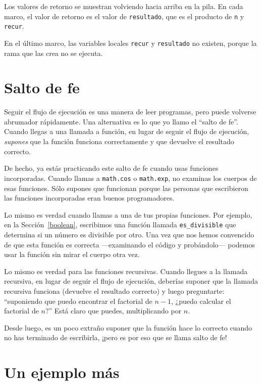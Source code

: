 \documentclass[10pt]{book}
\begin{document}
Los valores de retorno se muestran volviendo hacia arriba en la pila.  En cada
marco, el valor de retorno es el valor de {\tt resultado}, que es el
producto de {\tt n} y {\tt recur}.

En el último marco, las variables
locales {\tt recur} y {\tt resultado} no existen, porque
la rama que las crea no se ejecuta.


\section{Salto de fe}

Seguir el flujo de ejecución es una manera de leer programas, pero
puede volverse abrumador rápidamente.  Una
alternativa es lo que yo llamo el ``salto de fe''.  Cuando llegas a una
llamada a función, en lugar de seguir el flujo de ejecución, {\em
supones} que la función funciona correctamente y que devuelve el resultado
correcto.

De hecho, ya estás practicando este salto de fe cuando usas
funciones incorporadas.  Cuando llamas a {\tt math.cos} o {\tt math.exp},
no examinas los cuerpos de esas funciones.  Sólo
supones que funcionan porque las personas que escribieron las funciones
incorporadas eran buenos programadores.

Lo mismo es verdad cuando llamas a una de tus propias funciones.  Por
ejemplo, en la Sección~\ref{boolean}, escribimos una función llamada
\verb"es_divisible" que determina si un número es divisible por
otro.  Una vez que nos hemos convencido de que esta función es
correcta ---examinando el código y probándolo--- podemos usar la función
sin mirar el cuerpo otra vez.

Lo mismo es verdad para las funciones recursivas.  Cuando llegues a la llamada
recursiva, en lugar de seguir el flujo de ejecución, deberías suponer
que la llamada recursiva funciona (devuelve el resultado correcto) y luego
preguntarte: ``suponiendo que puedo encontrar el factorial de $n-1$, ¿puedo
calcular el factorial de $n$?''  Está claro que
puedes, multiplicando por $n$.

Desde luego, es un poco extraño suponer que la función hace lo
correcto cuando no has terminado de escribirla, ¡pero es por eso
que se llama salto de fe!


\section{Un ejemplo más}
\label{one.more.example}
\end{document}
